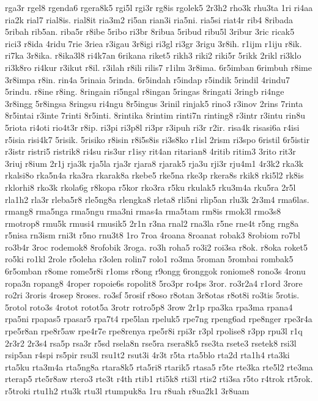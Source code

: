 {rga3r rgel8 rgenda6 rgera8k5 rgi5l rgi3r rg8is rgolek5 2r3h2 rho3k rhu3ta
1ri ri4aa ria2k rial7 rial8is. rial8it ria3m2 ri5an rian3i ria5ni. ria5si
riat4r rib4 8ribada 5ribah rib5an. riba5r r8ibe 5ribo ri3br 8ribua 5ribud
ribu5l 3ribur 3ric ricak5 rici3 r8ida 4ridu 7rie 3riea r3igau 3r8igi ri3gl
ri3gr 3rigu 3r8ih. r1ijm r1iju r8ik. ri7ka 3r8ika. r8ika3l8 ri4k7an
6rikana riket5 rikh3 riki2 riki5r 5rikk 2rikl ri3klo ri3k8ro ri4kur r3ikut
r8il. r3ilah r8ili rilis7 r1ilm 3r8ima. 6r5imban 6rimbuh r8ime 3r8impa
r8in. rin4a 5rinaia 5rinda. 6r5indah r5indap r5indik 5rindil 4rindu7
5rindu. r8ine r8ing. 8ringain ri5ngal r8ingan 5ringas 8ringati 3ringb
ri4nge 3r8ingg 5r8ingsa 8ringsu ri4ngu 8r5ingus 3rinil rinjak5 rino3
r3inov 2rins 7rinta 8r5intai r3inte 7rinti 8r5inti. 8rintika 8rintim
rinti7n rinting8 r3intr r3intu rin8u 5riota ri4oti rio4t3r r8ip. ri3pi
ri3p8l ri3pr r3ipuh ri3r r2ir. risa4k risasi6a r4isi r5isia risi4k7
5risik. 5risiko r8isin r8i5s8is ri3s8ko r1isl 2rism ri3spo 6ristil
6r5istir r3istr ristri5 ristrik8 ri4su ris3ur r1isy rit4an ritarian8
4ritib ritim3 3rito rit3r 3riuj r8ium 2r1j rja3k rja5la rja3r rjara8
rjarak5 rja3u rji3r rju4m1 4r3k2 rka3k rkalsi8o rka5n4a rka3ra rkarak8a
rkebe5 rke5na rke3p rkera8s rkik8 rki5l2 rk8is rklorhi8 rko3k rkola6g
r8kopa r5kor rko3ra r5ku rkulak5 rku3m4a rku5ra 2r5l rla1h2 rla3r rleba5r8
rle5ng8a rlengka8 rleta8 rli5ni rlip5an rlu3k 2r3m4 rma6las. rmang8
rma5nga rma5ngu rma3ni rmas4a rma5tam rm8is rmok3l rmo3s8 rmotrop8 rmu5k
rmusi4 rmusik5 2r1n r3na rnal2 rna3la r5ne rne4t r5ng rng8a r5nisa rn3ism
rni3t r5no rnu3t8 1ro 7roa 4roana 8roanat robak3 8robiom ro7bl ro3b4r 3roc
rodemok8 8rofobik 3roga. ro3h roha5 ro3i2 roi3sa r8ok. r8oka roket5 ro5ki
ro1kl 2role r5oleha r3olen rolin7 rolo1 ro3ma 5roman 5rombai rombak5
6r5omban r8ome rome5r8i r1oms r8ong r9ongg 6ronggok roniome8 rono3s 4ronu
ropa3n ropang8 4roper ropoie6s ropolit8 5ro3pr ro4ps 3ror. ro3r2a4 r1ord
3rore ro2ri 3roris 4rosep 8roses. ro3sf 5rosif r8oso r8otan 3r8otas r8ot8i
ro3tis 5rotis. 5rotol roto3s 4rotot rotot5a 3rotr rotro5p8 3row 2r1p
rpa3ka rpa3ma rpana4 rpa5ni rpapas5 rpasar5 rpa7t4 rpe5lan rpeluk5 rpe7ng
rpeng6ad rpe8nger rpe3r4a rpe5r8an rpe8r5aw rpe4r7e rpe8renya rpe5r8i
rpi3r r3pl rpolise8 r3pp rpu3l r1q 2r3r2 2r3s4 rsa5p rsa3r r5sd rsela8n
rse5ra rsera8k5 rse3ta rsete3 rsetek8 rsi3l rsip5an r4spi rs5pir rsu3l
rsu1t2 rsut3i 4r3t r5ta rta5blo rta2d rta1h4 rta3ki rta5ku rta3m4a
rta5ng8a rtara8k5 rta5ri8 rtarik5 rtasa5 r5te rte3ka rte5l2 rte3ma rterap5
rte5r8aw rtero3 rte3t r4th rtib1 rti5k8 rti3l rtis2 rti3sa r5to r4trok
rt5rok. r5troki rtu1h2 rtu3k rtu3l rtumpuk8a 1ru r8uah r8ua2k1 3r8uam
}
